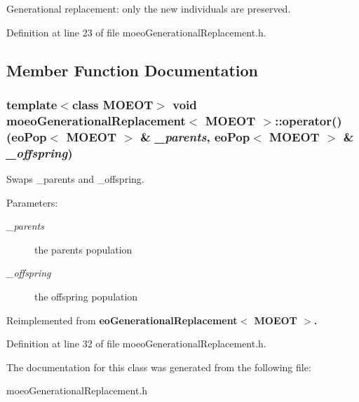 Generational replacement: only the new individuals are preserved. 



Definition at line 23 of file moeo\-Generational\-Replacement.h.

\subsection{Member Function Documentation}
\subsubsection{\setlength{\rightskip}{0pt plus 5cm}template$<$class MOEOT$>$ void \bf{moeo\-Generational\-Replacement}$<$ MOEOT $>$::operator() (\bf{eo\-Pop}$<$ MOEOT $>$ \& {\em \_\-parents}, \bf{eo\-Pop}$<$ MOEOT $>$ \& {\em \_\-offspring})\hspace{0.3cm}{\tt  [inline]}}\label{classmoeoGenerationalReplacement_7b8ac20d375820ba44a9f3dd4b95e120}


Swaps \_\-parents and \_\-offspring. 

\begin{Desc}
\item[Parameters:]
\begin{description}
\item[{\em \_\-parents}]the parents population \item[{\em \_\-offspring}]the offspring population \end{description}
\end{Desc}


Reimplemented from \bf{eo\-Generational\-Replacement$<$ MOEOT $>$}.

Definition at line 32 of file moeo\-Generational\-Replacement.h.

The documentation for this class was generated from the following file:\begin{CompactItemize}
\item 
moeo\-Generational\-Replacement.h\end{CompactItemize}
